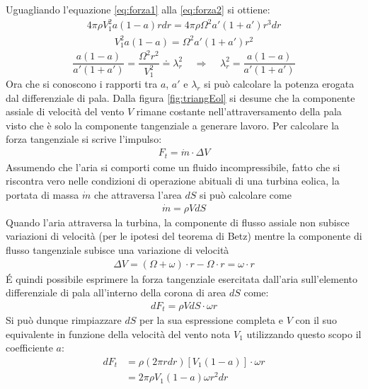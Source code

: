 Uguagliando l'equazione \ref{eq:forza1} alla \ref{eq:forza2} si ottiene:
\begin{align*}
4 \pi \rho V_1^2 a \left( 1 - a \right) r dr = 4 \pi \rho \Omega^2 a' \left( 1 + a' \right) r^3 dr
\end{align*}
\begin{align*}
V_1^2 a \left( 1 - a \right) = \Omega^2 a' \left( 1 + a' \right) r^2
\end{align*}
\begin{equation}\label{eq:lambdara}
\frac{a \left( 1 - a \right)}{a' \left(1 + a' \right)} = \frac{\Omega^2 r^2}{V_1^2}\doteq \lambda_r^2 \;\;\;\; \Rightarrow \;\;\;\; \lambda_r^2 = \frac{a \left(1 - a \right)}{a' \left( 1 + a' \right)}
\end{equation}
Ora che si conoscono i rapporti tra $a$, $a'$ e $\lambda_r$ si può calcolare la potenza erogata dal differenziale di pala. Dalla figura \ref{fig:triangEol} si desume che la componente assiale di velocità del vento $V$ rimane costante nell'attraversamento della pala visto che è solo la componente tangenziale a generare lavoro. Per calcolare la forza tangenziale si scrive l'impulso:
\begin{align*}
F_t = \dot{m} \cdot \Delta V
\end{align*}
Assumendo che l'aria si comporti come un fluido incompressibile, fatto che si riscontra vero nelle condizioni di operazione abituali di una turbina eolica, la portata di massa $\dot{m}$ che attraversa l'area $dS$ si può calcolare come 
\begin{align*}
\dot{m} = \rho V dS
\end{align*}
Quando l'aria attraversa la turbina, la componente di flusso assiale non subisce variazioni di velocità (per le ipotesi del teorema di Betz) mentre la componente di flusso tangenziale subisce una variazione di velocità
\begin{align*}
\Delta V = \left( \Omega + \omega \right) \cdot r - \Omega \cdot r = \omega \cdot r
\end{align*}
\'E quindi possibile esprimere la forza tangenziale esercitata dall'aria sull'elemento differenziale di pala all'interno della corona di area $dS$ come:
\begin{align*}
dF_t = \rho V dS \cdot \omega r
\end{align*}
Si può dunque rimpiazzare $dS$ per la sua espressione completa e $V$ con il suo equivalente in funzione della velocità del vento nota $V_1$ utilizzando questo scopo il coefficiente $a$:
\begin{align*}
dF_t &= \rho \left( 2 \pi r dr \right) \left[ V_1 \left(1 -a \right) \right] \cdot \omega r\\
& = 2 \pi \rho V_1 \left( 1-a \right) \omega r^2 dr
\end{align*}
